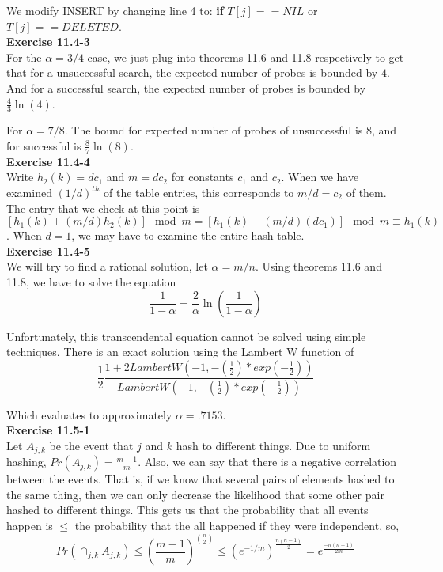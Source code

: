 \documentclass{article}
\begin{document}
We modify INSERT by changing line 4 to: \textbf{if} $T[j] ==NIL$ or $T[j] == DELETED$.\\

\noindent\textbf{ Exercise 11.4-3} \\

For the $\alpha = 3/4$ case, we just plug into theorems 11.6 and 11.8 respectively to get that for a unsuccessful search, the expected number of probes is bounded by $4$. And for a successful search, the expected number of probes is bounded by $\frac{4}{3}\ln(4)$.

For $\alpha = 7/8$. The bound for expected number of probes of unsuccessful is $8$, and for successful is $\frac{8}{7}\ln(8)$.\\

\noindent\textbf{Exercise 11.4-4}\\

Write $h_2(k) = dc_1$ and $m = dc_2$ for constants $c_1$ and $c_2$.  When we have examined $(1/d)^{th}$ of the table entries, this corresponds to $m/d = c_2$ of them. The entry that we check at this point is $[h_1(k) + (m/d)h_2(k)] \mod m =[ h_1(k) + (m/d)(dc_1)] \mod m \equiv h_1(k)$.  When $d=1$, we may have to examine the entire hash table. \\

\noindent\textbf{ Exercise 11.4-5} \\

We will try to find a rational solution, let $\alpha = m/n$. Using theorems 11.6 and 11.8, we have to solve the equation 
\[
\frac{1}{1-\alpha} = \frac{2}{\alpha}\ln(\frac{1}{1-\alpha}) 
\]

Unfortunately, this transcendental equation cannot be solved using simple techniques. There is an exact solution using the Lambert W function of 
\[
\frac{1}{2}\frac{1+2LambertW(-1, -(\frac{1}{2})*exp(-\frac{1}{2}))}{LambertW(-1, -(\frac{1}{2})*exp(-\frac{1}{2})) }
\]

Which evaluates to approximately $\alpha = .7153$.\\

\noindent\textbf{ Exercise 11.5-1} \\

Let $A_{j,k}$ be the event that $j$ and $k$ hash to different things. Due to uniform hashing, $Pr(A_{j,k})  = \frac{m-1}{m}$. Also, we can say that there is a negative correlation between the events. That is, if we know that several pairs of elements hashed to the same thing, then we can only decrease the likelihood that some other pair hashed to different things. This gets us that the probability that all events happen is $\le$ the probability that the all happened if they were independent, so,
\[
Pr(\cap_{j,k} A_{j,k}) \le \left(\frac{m-1}{m}\right)^{\binom{n}{2}} \le \left( e^{-1/m}\right)^{\frac{n(n-1)}{2}} = e^{\frac{-n(n-1)}{2m}}
\]
\end{document}
